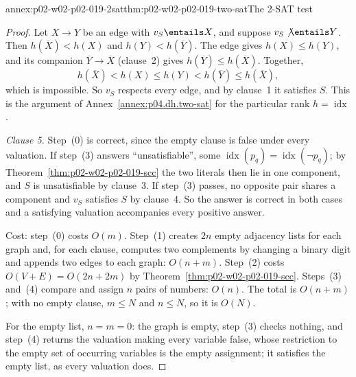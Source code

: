 \begin{annexitem}{annex:p02-w02-p02-019-2sat}{thm:p02-w02-p02-019-two-sat}{The 2-SAT test}
\begin{proof}
Let \(X\to Y\) be an edge with \(v_S\entails X\), and suppose
\(v_S\not\entails Y\).  Then \(h(\overline X)<h(X)\) and \(h(Y)<h(\overline
Y)\).  The edge gives \(h(X)\leq h(Y)\), and its companion
\(\overline Y\to\overline X\) (clause~2) gives
\(h(\overline Y)\leq h(\overline X)\).  Together,
\[
 h(\overline X)<h(X)\leq h(Y)<h(\overline Y)\leq h(\overline X),
\]
which is impossible.  So \(v_S\) respects every edge, and by clause~1 it
satisfies \(S\).  This is the argument of Annex~\ref{annex:p04.dh.two-sat}
for the particular rank \(h=\operatorname{idx}\).

\emph{Clause 5.}  Step~(0) is correct, since the empty clause is false under
every valuation.  If step~(3) answers ``unsatisfiable'', some
\(\operatorname{idx}(p_q)=\operatorname{idx}(\neg p_q)\); by
Theorem~\ref{thm:p02-w02-p02-019-scc} the two literals then lie in one
component, and \(S\) is unsatisfiable by clause~3.  If step~(3) passes, no
opposite pair shares a component and \(v_S\) satisfies \(S\) by clause~4.  So
the answer is correct in both cases and a satisfying valuation accompanies
every positive answer.

Cost: step~(0) costs \(O(m)\).  Step~(1) creates \(2n\) empty adjacency lists
for each graph and, for each clause, computes two complements by changing a
binary digit and appends two edges to each graph: \(O(n+m)\).  Step~(2) costs
\(O(V+E)=O(2n+2m)\) by Theorem~\ref{thm:p02-w02-p02-019-scc}.  Steps~(3)
and~(4) compare and assign \(n\) pairs of numbers: \(O(n)\).  The total is
\(O(n+m)\); with no empty clause, \(m\leq N\) and \(n\leq N\), so it is
\(O(N)\).

For the empty list, \(n=m=0\): the graph is empty, step~(3) checks nothing,
and step~(4) returns the valuation making every variable false, whose
restriction to the empty set of occurring variables is the empty assignment;
it satisfies the empty list, as every valuation does.
\end{proof}
\end{annexitem}

